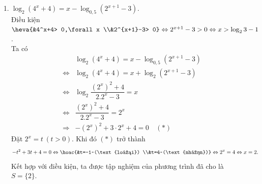 \begin{bt}
{\begin{enumerate}
			Điều kiện $9-2^x  > 0\Leftrightarrow 2^x < 9\Leftrightarrow x < \log_2 9$.\\
			Ta có 
			\allowdisplaybreaks 
			\begin{eqnarray*}
				&&\log_2\left(9-2^x\right)=3-x 
				\\ 
				&  \Leftrightarrow& 9-2^x=2^{3-x}
				\\ 
				&\Leftrightarrow& 9-2^x=2^3\cdot  \dfrac{1}{2^x}
				 \\
				&  \Leftrightarrow& 9\cdot 2^x-(2^x)^2-8=0\quad (*)
			\end{eqnarray*}
			Đặt $2^x=t~(t > 0)$. Khi đó $(*)$ trở thành \[-t^2+9t-8=0\Leftrightarrow 
			\hoac{&t=8~(\text{nhận  }) \\&t=1~(\text{nhận})}
			\Leftrightarrow \hoac{&2^x=1\Leftrightarrow x=0\\  &2^x=8\Leftrightarrow x=3}\]
			Kết hợp  với điều kiện, ta được tập nghiệm của phương trình đã cho là $S=\{0; 3\}$.
			\item $\log_2\left(4^x+4\right)=x-\log  _{0,5}\left(2^{x+1}-3\right)$.\\
			Điều kiện $\heva{&4^x+4> 0,\forall x \\&2^{x+1}-3>  0} \Leftrightarrow 2^{x+1}-3> 0\Leftrightarrow x > \log_2 3-1$.\\
			Ta có 
			\allowdisplaybreaks 
			\begin{eqnarray*}
				&&\log_2\left(4^x+4\right)=x-\log  _{0,5}\left(2^{x+1}-3\right)
				 \\
				&\Leftrightarrow&  \log_2\left(4^x+4\right)=x+\log_2\left(2^{x+1}-3\right)
				 \\
				&\Leftrightarrow& \log_2  \dfrac{(2^x)^2+4}{2.2^x-3}=x
				\\ 
				&\Leftrightarrow&  \dfrac{(2^x)^2+4}{2.2^x-3}=2^x
				\\ 
				&\Rightarrow&-(2^x)^2+3\cdot 2^x+4=0\quad(*) 
			\end{eqnarray*}
			Đặt $2^x=t~(t > 0)$. Khi  đó $(*)$ trở thành \[-t^2+3t+4=0\Leftrightarrow
			\hoac{&t=-1~(\text{loại}) \\&t=4~(\text{nhận})} 
			\Leftrightarrow 2^x=4\Leftrightarrow  x=2.\]
			Kết hợp với điều kiện, ta được tập nghiệm của phương trình đã cho  là $S=\{2\}$.
		\end{enumerate}
	} 
\end{bt}

